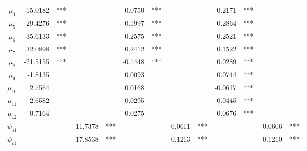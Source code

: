 \documentclass[3p]{elsarticle}
\begin{document}
\begin{table}[]
\begin{tabular}{crlrlrlrlrlrl}
\multicolumn{1}{c|}{$\mu_4$}     & -15.0182        & ***       &                 &           & -0.0750        & ***        &                &            & -0.2171        & ***        &                 &           \\
\multicolumn{1}{c|}{$\mu_5$}     & -29.4276        & ***       &                 &           & -0.1997        & ***        &                &            & -0.2864        & ***        &                 &           \\
\multicolumn{1}{c|}{$\mu_6$}     & -35.6133        & ***       &                 &           & -0.2575        & ***        &                &            & -0.2521        & ***        &                 &           \\
\multicolumn{1}{c|}{$\mu_7$}     & -32.0898        & ***       &                 &           & -0.2412        & ***        &                &            & -0.1522        & ***        &                 &           \\
\multicolumn{1}{c|}{$\mu_8$}     & -21.5155        & ***       &                 &           & -0.1448        & ***        &                &            & 0.0289         & ***        &                 &           \\
\multicolumn{1}{c|}{$\mu_9$}     & -1.8135         &           &                 &           & 0.0093         &            &                &            & 0.0744         & ***        &                 &           \\
\multicolumn{1}{c|}{$\mu_{10}$}    & 2.7564          &           &                 &           & 0.0168         &            &                &            & -0.0617        & ***        &                 &           \\
\multicolumn{1}{c|}{$\mu_{11}$}    & 2.6582          &           &                 &           & -0.0295        &            &                &            & -0.0445        & ***        &                 &           \\
\multicolumn{1}{c|}{$\mu_{12}$}    & -0.7164         &           &                 &           & -0.0275        &            &                &            & -0.0676        & ***        &                 &           \\
\multicolumn{1}{c|}{$\psi_{s1}$}   &                 &           & 11.7378         & ***       &                &            & 0.0611         & ***        &                &            & 0.0606         & ***       \\
\multicolumn{1}{c|}{$\psi_{c1}$}   &                 &           & -17.8538        & ***       &                &            & -0.1213        & ***        &                &            & -0.1210        & ***       \\

\end{tabular}
\end{table}
\end{document}
